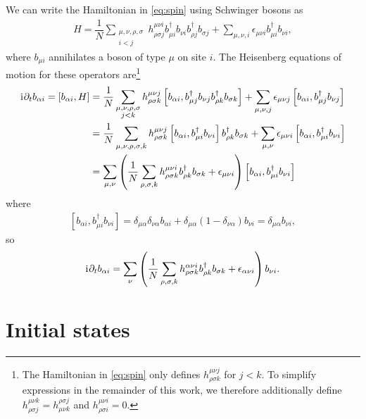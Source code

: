 \documentclass[nofootinbib,notitlepage,11pt]{revtex4-2}
\newcommand{\f}[2]{\dfrac{#1}{#2}} %
\newcommand{\p}[1]{\left(#1\right)} %
\renewcommand{\sp}[1]{\left[#1\right]} %
\renewcommand{\d}{\partial} %
\renewcommand{\i}{\mathrm{i}\mkern1mu} %
\newcommand{\1}{\mathds{1}}
\begin{document}
We can write the Hamiltonian in \eqref{eq:spin} using Schwinger bosons as
\begin{align}
  H = \f1N \sum_{\substack{\mu,\nu,\rho,\sigma\\i<j}}
  h^{\mu\nu i}_{\rho\sigma j}
  b_{\mu i}^\dag b_{\nu i} b_{\rho j}^\dag b_{\sigma j}
  + \sum_{\mu,\nu,i} \epsilon_{\mu\nu i} b_{\mu i}^\dag b_{\nu i},
\end{align}
where $b_{\mu i}$ annihilates a boson of type $\mu$ on site $i$.
The Heisenberg equations of motion for these operators are\footnote{The Hamiltonian in \eqref{eq:spin} only defines $h^{\mu\nu j}_{\rho\sigma k}$ for $j<k$.
  To simplify expressions in the remainder of this work, we therefore additionally define $h^{\mu\nu k}_{\rho\sigma j}=h^{\rho\sigma j}_{\mu\nu k}$ and $h^{\mu\nu i}_{\rho\sigma i}=0$.}
\begin{align}
  \i \d_t b_{\alpha i} = \sp{b_{\alpha i}, H}
  &= \f1N \sum_{\substack{\mu,\nu,\rho,\sigma\\j<k}}
  h^{\mu\nu j}_{\rho\sigma k}
  \sp{b_{\alpha i}, b_{\mu j}^\dag b_{\nu j} b_{\rho k}^\dag b_{\sigma k}}
  + \sum_{\mu,\nu,j} \epsilon_{\mu\nu j}
  \sp{b_{\alpha i}, b_{\mu j}^\dag b_{\nu j}} \\
  &= \f1N \sum_{\mu,\nu,\rho,\sigma,k}
  h^{\mu\nu j}_{\rho\sigma k}
  \sp{b_{\alpha i}, b_{\mu i}^\dag b_{\nu i}} b_{\rho k}^\dag b_{\sigma k}
  + \sum_{\mu,\nu} \epsilon_{\mu\nu i}
  \sp{b_{\alpha i}, b_{\mu i}^\dag b_{\nu i}} \\
  &= \sum_{\mu,\nu} \p{\f1N \sum_{\rho,\sigma,k}
    h^{\mu\nu i}_{\rho\sigma k} b_{\rho k}^\dag b_{\sigma k}
    + \epsilon_{\mu\nu i}}
  \sp{b_{\alpha i}, b_{\mu i}^\dag b_{\nu i}}
\end{align}
where
\begin{align}
  \sp{b_{\alpha i}, b_{\mu i}^\dag b_{\nu i}}
  = \delta_{\mu\alpha} \delta_{\nu\alpha} b_{\alpha i}
  + \delta_{\mu\alpha} \p{1-\delta_{\nu\alpha}} b_{\nu i}
  = \delta_{\mu\alpha} b_{\nu i},
\end{align}
so
\begin{align}
  \i \d_t b_{\alpha i}
  = \sum_\nu \p{\f1N \sum_{\rho,\sigma,k}
    h^{\alpha\nu i}_{\rho\sigma k} b_{\rho k}^\dag b_{\sigma k}
    + \epsilon_{\alpha\nu i}} b_{\nu i}.
\end{align}

\section{Initial states}
\end{document}
